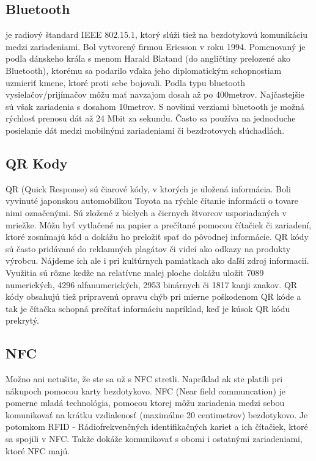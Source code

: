 \subsection{Bluetooth} je radiový štandard IEEE 802.15.1, ktorý slúži tiež na bezdotykovú komunikáciu medzi zariadeniami. Bol vytvorený firmou Ericsson v roku 1994. Pomenovaný je podľa dánskeho kráľa s menom Harald Blatand (do angličtiny prelozené ako Bluetooth), ktorému sa podarilo vďaka jeho diplomatickým schopnostiam uzmieriť kmene, ktoré proti sebe bojovali. Podla typu bluetooth vysielačov/prijímačov môžu mať navzajom dosah až po 400metrov. Najčastejšie sú však zariadenia s dosahom 10metrov. S novšími verziami bluetooth je možná rýchlosť prenosu dát až 24 Mbit za sekundu. Často sa používa na jednoduche posielanie dát medzi mobilnými zariadeniami či bezdrotovych slúchadlách. 


\subsection{QR Kody} QR (Quick Response) sú čiarové kódy, v ktorých je uložená informácia. Boli vyvinuté japonskou automobilkou Toyota na rýchle čítanie informácii o tovare nimi označenými. Sú zložené z bielych a čiernych štvorcov usporiadaných v mriežke. Môžu byť vytlačené na papier a prečítané pomocou čítačiek či zariadení, ktoré zosnímajú kód a dokážu ho preložiť spať do pôvodnej informácie.  QR kódy sú často pridávané do reklamných plagátov či videí ako odkazy na produkty výrobcu. Nájdeme ich ale i pri kultúrnych pamiatkach ako ďaľší zdroj informacií. Využitia sú rôzne kedže na relatívne malej ploche dokážu uložit 7089 numerických, 4296 alfanumerických, 2953 binárnych či 1817 kanji znakov\cite{qrcode-about}. QR kódy obsahujú tiež pripravenú opravu chýb pri mierne poškodenom QR kóde a tak je čítačka schopná prečítať informáciu napríklad, keď je kúsok QR kódu prekrytý\cite{qrcode-about}. 

\subsection{NFC} Možno ani netušite, že ste sa už s NFC stretli. Napríklad ak ste platili pri nákupoch pomocou karty bezdotykovo. NFC (Near field communcation) je pomerne mladá technológia, pomocou ktorej môžu zariadenia medzi sebou komunikovať na krátku vzdialenosť (maximálne 20 centimetrov) bezdotykovo. Je potomkom RFID - Rádiofrekvenčných identifikačných kariet a ich čítačiek, ktoré sa spojili v NFC. Takže dokáže komunikovať s obomi i ostatnými zariadeniami, ktoré NFC majú.

